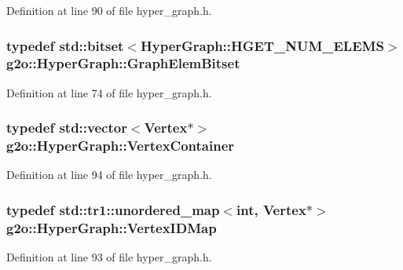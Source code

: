 Definition at line 90 of file hyper\+\_\+graph.\+h.

\subsubsection[{\texorpdfstring{Graph\+Elem\+Bitset}{GraphElemBitset}}]{\setlength{\rightskip}{0pt plus 5cm}typedef std\+::bitset$<${\bf Hyper\+Graph\+::\+H\+G\+E\+T\+\_\+\+N\+U\+M\+\_\+\+E\+L\+E\+MS}$>$ {\bf g2o\+::\+Hyper\+Graph\+::\+Graph\+Elem\+Bitset}}\hypertarget{classg2o_1_1HyperGraph_a7b8fda20e1b03e92aeceeac6e8218b73}{}\label{classg2o_1_1HyperGraph_a7b8fda20e1b03e92aeceeac6e8218b73}


Definition at line 74 of file hyper\+\_\+graph.\+h.

\subsubsection[{\texorpdfstring{Vertex\+Container}{VertexContainer}}]{\setlength{\rightskip}{0pt plus 5cm}typedef std\+::vector$<${\bf Vertex}$\ast$$>$ {\bf g2o\+::\+Hyper\+Graph\+::\+Vertex\+Container}}\hypertarget{classg2o_1_1HyperGraph_a9339534c99300a0ddac87ba976ef188c}{}\label{classg2o_1_1HyperGraph_a9339534c99300a0ddac87ba976ef188c}


Definition at line 94 of file hyper\+\_\+graph.\+h.

\subsubsection[{\texorpdfstring{Vertex\+I\+D\+Map}{VertexIDMap}}]{\setlength{\rightskip}{0pt plus 5cm}typedef std\+::tr1\+::unordered\+\_\+map$<$int, {\bf Vertex}$\ast$$>$ {\bf g2o\+::\+Hyper\+Graph\+::\+Vertex\+I\+D\+Map}}\hypertarget{classg2o_1_1HyperGraph_a97307eac064ebf4b3e2cfbf0718035b5}{}\label{classg2o_1_1HyperGraph_a97307eac064ebf4b3e2cfbf0718035b5}


Definition at line 93 of file hyper\+\_\+graph.\+h.

